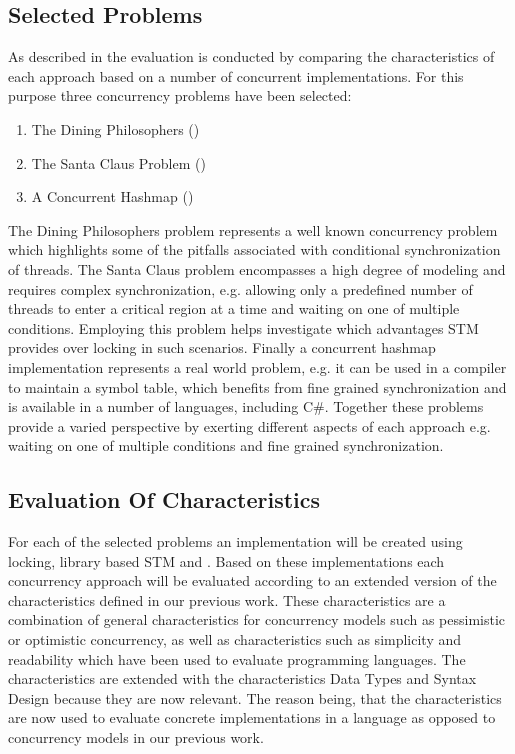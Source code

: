 \subsection{Selected Problems}
As described in  the evaluation is conducted by comparing the characteristics of each approach based on a number of concurrent implementations. For this purpose three concurrency problems have been selected:
\begin{enumerate}
\item The Dining Philosophers ()
\item The Santa Claus Problem ()
\item A Concurrent Hashmap ()
\end{enumerate}
The Dining Philosophers problem represents a well known concurrency problem which highlights some of the pitfalls associated with conditional synchronization of threads. The Santa Claus problem encompasses a high degree of modeling and requires complex synchronization, e.g. allowing only a predefined number of threads to enter a critical region at a time and waiting on one of multiple conditions. Employing this problem helps investigate which advantages \ac{STM} provides over locking in such scenarios. Finally a concurrent hashmap implementation represents a real world problem, e.g. it can be used in a compiler to maintain a symbol table\cite{cormen2009introduction}, which benefits from fine grained synchronization and is available in a number of languages, including C\#. Together these problems provide a varied perspective by exerting different aspects of each approach e.g. waiting on one of multiple conditions and fine grained synchronization.

\subsection{Evaluation Of Characteristics}\label{sec:eval_chars}
For each of the selected problems an implementation will be created using locking, library based \ac{STM} and \stmname. Based on these implementations each concurrency approach will be evaluated according to an extended version of the characteristics defined in our previous work\cite[p. 15-21]{dpt907e14trending}. These characteristics are a combination of general characteristics for concurrency models such as pessimistic or optimistic concurrency, as well as characteristics such as simplicity and readability which have been used to evaluate programming languages\cite[p. 7]{sebestaProLang}. The characteristics are extended with the characteristics Data Types and Syntax Design because they are now relevant. The reason being, that the characteristics are now used to evaluate concrete implementations in a language as opposed to concurrency models in our previous work\cite{dpt907e14trending}.

